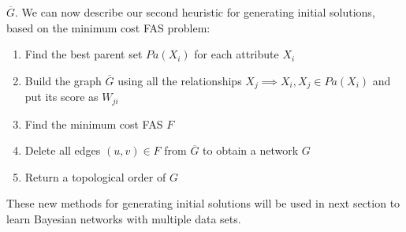         $\overline{G}$.  We can now describe our second heuristic for
        generating initial solutions, based on the minimum cost FAS
        problem:
	\begin{enumerate}
		\item Find the best parent set ${Pa}( X_i )$ for each attribute $X_i$
		\item Build the graph $\overline{G}$ using all the relationships $X_j \implies X_i, X_j \in {Pa}( X_i )$ and put its score as $W_{ji}$
		\item Find the minimum cost FAS $F$
		\item Delete all edges $(u,v) \in F$ from $\overline{G}$ to obtain a network $G$
		\item Return a topological order of $G$
	\end{enumerate}

These new methods for generating initial solutions will be used in next section to learn Bayesian networks with multiple data sets.